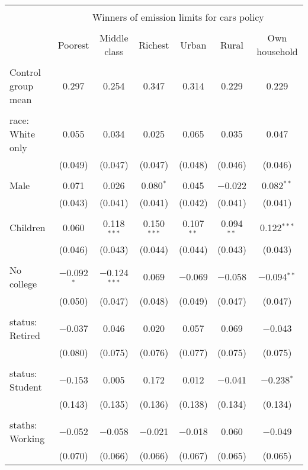 
\begin{tabular}{@{\extracolsep{5pt}}lcccccc} 
\\[-1.8ex]\hline 
\hline \\[-1.8ex] 
 & \multicolumn{6}{c}{Winners of emission limits for cars policy} \\ 
\cline{2-7} 
\\[-1.8ex] & Poorest & Middle class & Richest & Urban & Rural & Own household \\ 
\hline \\[-1.8ex] 
 Control group mean & 0.297 & 0.254 & 0.347 & 0.314 & 0.229 & 0.229  \\ \hline \\[-1.8ex] race: White only & 0.055 & 0.034 & 0.025 & 0.065 & 0.035 & 0.047 \\ 
  & (0.049) & (0.047) & (0.047) & (0.048) & (0.046) & (0.046) \\ 
  & & & & & & \\ 
 Male & 0.071 & 0.026 & 0.080$^{*}$ & 0.045 & $-$0.022 & 0.082$^{**}$ \\ 
  & (0.043) & (0.041) & (0.041) & (0.042) & (0.041) & (0.041) \\ 
  & & & & & & \\ 
 Children & 0.060 & 0.118$^{***}$ & 0.150$^{***}$ & 0.107$^{**}$ & 0.094$^{**}$ & 0.122$^{***}$ \\ 
  & (0.046) & (0.043) & (0.044) & (0.044) & (0.043) & (0.043) \\ 
  & & & & & & \\ 
 No college & $-$0.092$^{*}$ & $-$0.124$^{***}$ & 0.069 & $-$0.069 & $-$0.058 & $-$0.094$^{**}$ \\ 
  & (0.050) & (0.047) & (0.048) & (0.049) & (0.047) & (0.047) \\ 
  & & & & & & \\ 
 status: Retired & $-$0.037 & 0.046 & 0.020 & 0.057 & 0.069 & $-$0.043 \\ 
  & (0.080) & (0.075) & (0.076) & (0.077) & (0.075) & (0.075) \\ 
  & & & & & & \\ 
 status: Student & $-$0.153 & 0.005 & 0.172 & 0.012 & $-$0.041 & $-$0.238$^{*}$ \\ 
  & (0.143) & (0.135) & (0.136) & (0.138) & (0.134) & (0.134) \\ 
  & & & & & & \\ 
 staths: Working & $-$0.052 & $-$0.058 & $-$0.021 & $-$0.018 & 0.060 & $-$0.049 \\ 
  & (0.070) & (0.066) & (0.066) & (0.067) & (0.065) & (0.065) \\ 

\end{tabular}
